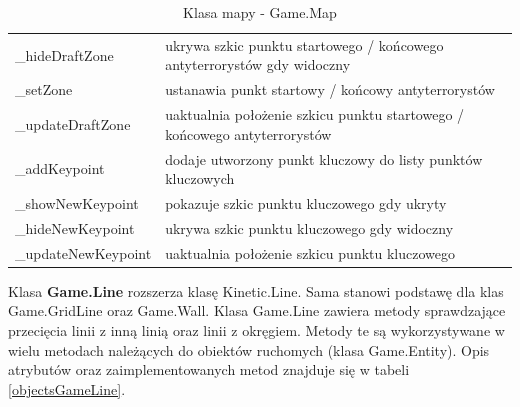 \begin{table}
\begin{center}
\begin{tabular}{|p{}|p{}|}
	\_hideDraftZone & ukrywa szkic punktu startowego / końcowego antyterrorystów gdy widoczny\\
	\_setZone & ustanawia punkt startowy / końcowy antyterrorystów\\ 
	\_updateDraftZone & uaktualnia położenie szkicu punktu startowego / końcowego antyterrorystów \\
	\_addKeypoint & dodaje utworzony punkt kluczowy do listy punktów kluczowych\\
	\_showNewKeypoint & pokazuje szkic punktu kluczowego gdy ukryty\\ 
	\_hideNewKeypoint & ukrywa szkic punktu kluczowego gdy widoczny\\
	\_updateNewKeypoint & uaktualnia położenie szkicu punktu kluczowego 
\\\hline
\end{tabular}
\caption {Klasa mapy - Game.Map\label{objectsGameMap}}
\end{center}
\end{table} 


Klasa \textbf{Game.Line} rozszerza klasę Kinetic.Line. Sama stanowi podstawę dla klas Game.GridLine oraz Game.Wall. Klasa Game.Line zawiera metody sprawdzające przecięcia linii z inną linią oraz linii z okręgiem. Metody te są wykorzystywane w wielu metodach należących do obiektów ruchomych (klasa Game.Entity). Opis atrybutów oraz zaimplementowanych metod znajduje się w tabeli \ref{objectsGameLine}.   

